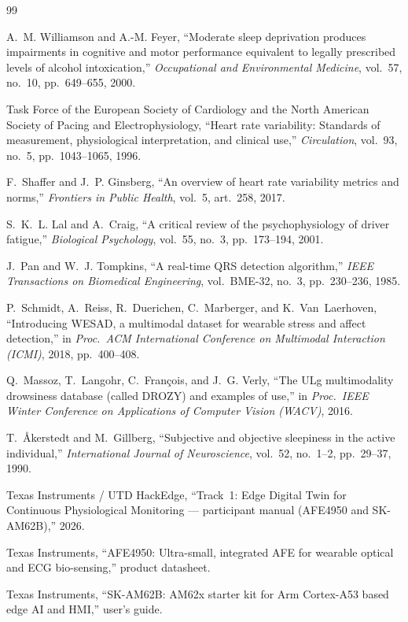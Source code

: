 \documentclass[11pt]{article}
\begin{document}
\begin{thebibliography}{99}

A.~M. Williamson and A.-M. Feyer, ``Moderate sleep deprivation produces impairments in cognitive and motor
performance equivalent to legally prescribed levels of alcohol intoxication,''
\emph{Occupational and Environmental Medicine}, vol.~57, no.~10, pp.~649--655, 2000.

Task Force of the European Society of Cardiology and the North American Society of Pacing and
Electrophysiology, ``Heart rate variability: Standards of measurement, physiological interpretation, and
clinical use,'' \emph{Circulation}, vol.~93, no.~5, pp.~1043--1065, 1996.

F.~Shaffer and J.~P. Ginsberg, ``An overview of heart rate variability metrics and norms,''
\emph{Frontiers in Public Health}, vol.~5, art.~258, 2017.

S.~K.~L. Lal and A.~Craig, ``A critical review of the psychophysiology of driver fatigue,''
\emph{Biological Psychology}, vol.~55, no.~3, pp.~173--194, 2001.

J.~Pan and W.~J. Tompkins, ``A real-time QRS detection algorithm,''
\emph{IEEE Transactions on Biomedical Engineering}, vol.~BME-32, no.~3, pp.~230--236, 1985.

P.~Schmidt, A.~Reiss, R.~Duerichen, C.~Marberger, and K.~Van~Laerhoven, ``Introducing WESAD, a multimodal
dataset for wearable stress and affect detection,'' in \emph{Proc.\ ACM International Conference on
Multimodal Interaction (ICMI)}, 2018, pp.~400--408.

Q.~Massoz, T.~Langohr, C.~Fran\c{c}ois, and J.~G. Verly, ``The ULg multimodality drowsiness database
(called DROZY) and examples of use,'' in \emph{Proc.\ IEEE Winter Conference on Applications of Computer
Vision (WACV)}, 2016.

T.~{\AA}kerstedt and M.~Gillberg, ``Subjective and objective sleepiness in the active individual,''
\emph{International Journal of Neuroscience}, vol.~52, no.~1--2, pp.~29--37, 1990.

Texas Instruments / UTD HackEdge, ``Track~1: Edge Digital Twin for Continuous Physiological Monitoring ---
participant manual (AFE4950 and SK-AM62B),'' 2026.

Texas Instruments, ``AFE4950: Ultra-small, integrated AFE for wearable optical and ECG bio-sensing,''
product datasheet.

Texas Instruments, ``SK-AM62B: AM62x starter kit for Arm Cortex-A53 based edge AI and HMI,'' user's guide.

\end{thebibliography}
\end{document}

